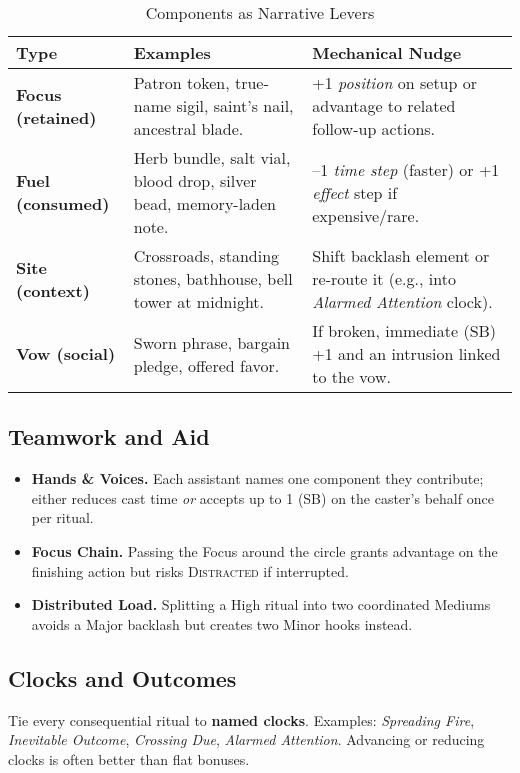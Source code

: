 \begin{table}[h]
\centering
\caption{Components as Narrative Levers}
\label{tab:ritual-components}
\renewcommand{\arraystretch}{1.12}
\begin{tabularx}{\linewidth}{>{\bfseries}l X X}
\toprule
Type & Examples & Mechanical Nudge \\
\midrule
Focus (retained) & Patron token, true-name sigil, saint's nail, ancestral blade. & +1 \emph{position} on setup or advantage to related follow-up actions. \\
Fuel (consumed) & Herb bundle, salt vial, blood drop, silver bead, memory-laden note. & –1 \emph{time step} (faster) or +1 \emph{effect} step if expensive/rare. \\
Site (context) & Crossroads, standing stones, bathhouse, bell tower at midnight. & Shift backlash element or re-route it (e.g., into \emph{Alarmed Attention} clock). \\
Vow (social) & Sworn phrase, bargain pledge, offered favor. & If broken, immediate (SB) +1 and an intrusion linked to the vow. \\
\bottomrule
\end{tabularx}
\end{table}

\subsection{Teamwork and Aid}\label{subsec:ritual-teamwork}
\begin{itemize}
\item \textbf{Hands \& Voices.} Each assistant names one component they contribute; either reduces cast time \emph{or} accepts up to 1 (SB) on the caster's behalf once per ritual.
\item \textbf{Focus Chain.} Passing the Focus around the circle grants advantage on the finishing action but risks \textsc{Distracted} if interrupted.
\item \textbf{Distributed Load.} Splitting a High ritual into two coordinated Mediums avoids a Major backlash but creates two Minor hooks instead.
\end{itemize}

\subsection{Clocks and Outcomes}\label{subsec:ritual-clocks}
Tie every consequential ritual to \textbf{named clocks}. Examples: \emph{Spreading Fire}, \emph{Inevitable Outcome}, \emph{Crossing Due}, \emph{Alarmed Attention}. Advancing or reducing clocks is often better than flat bonuses.

